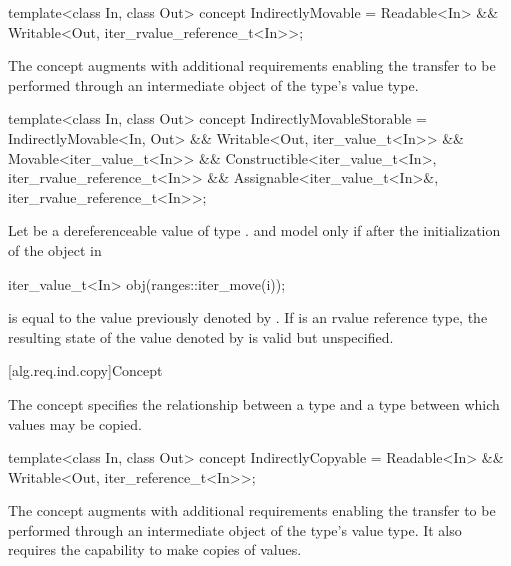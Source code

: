 %
\begin{codeblock}
template<class In, class Out>
  concept IndirectlyMovable =
    Readable<In> &&
    Writable<Out, iter_rvalue_reference_t<In>>;
\end{codeblock}

\pnum
The  concept augments
 with additional requirements enabling
the transfer to be performed through an intermediate object of the
 type's value type.

%
\begin{codeblock}
template<class In, class Out>
  concept IndirectlyMovableStorable =
    IndirectlyMovable<In, Out> &&
    Writable<Out, iter_value_t<In>> &&
    Movable<iter_value_t<In>> &&
    Constructible<iter_value_t<In>, iter_rvalue_reference_t<In>> &&
    Assignable<iter_value_t<In>&, iter_rvalue_reference_t<In>>;
\end{codeblock}

\pnum
Let  be a dereferenceable value of type .
 and  model 
only if after the initialization of the object  in
\begin{codeblock}
iter_value_t<In> obj(ranges::iter_move(i));
\end{codeblock}
 is equal to the value previously denoted by . If
 is an rvalue reference type,
the resulting state of the value denoted by  is
valid but unspecified.

[alg.req.ind.copy]{Concept }

\pnum
The  concept specifies the relationship between
a  type and a  type between which
values may be copied.

%
\begin{codeblock}
template<class In, class Out>
  concept IndirectlyCopyable =
    Readable<In> &&
    Writable<Out, iter_reference_t<In>>;
\end{codeblock}

\pnum
The  concept augments
 with additional requirements enabling
the transfer to be performed through an intermediate object of the
 type's value type. It also requires the capability
to make copies of values.

